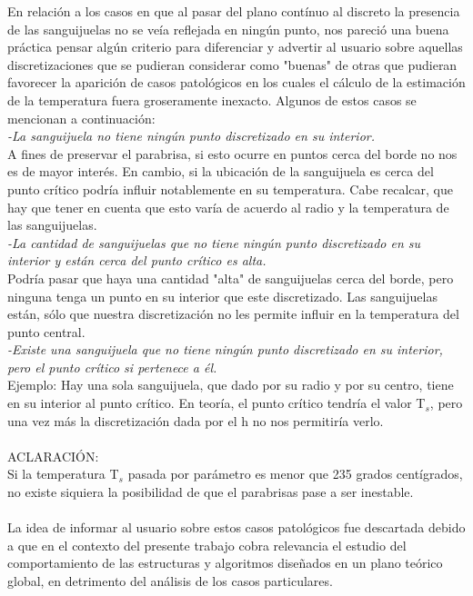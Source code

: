 \documentclass[double, 1.5in, 12pt]{beavtex}
\begin{document}
En relaci\'on a los casos en que al pasar del plano cont\'inuo al discreto la presencia de las sanguijuelas no se ve\'ia reflejada en ning\'un punto, nos pareci\'o una buena pr\'actica pensar alg\'un criterio para diferenciar y advertir al usuario sobre aquellas discretizaciones que se pudieran considerar como "buenas" de otras que pudieran favorecer la aparici\'on de casos patol\'ogicos en los cuales el c\'alculo de la estimaci\'on de la temperatura fuera groseramente inexacto. Algunos de estos casos se mencionan a continuaci\'on: \\
\emptyline
\textit{-La sanguijuela no tiene ning\'un punto discretizado en su interior.} \\
A fines de preservar el parabrisa, si esto ocurre en puntos cerca del borde no nos es de mayor inter\'es. En cambio, si la ubicaci\'on de la sanguijuela es cerca del punto cr\'itico podr\'ia influir notablemente en su temperatura. Cabe recalcar, que hay que tener en cuenta que esto var\'ia de acuerdo al radio y la temperatura de las sanguijuelas. \\
\emptyline
\textit{-La cantidad de sanguijuelas que no tiene ning\'un punto discretizado en su interior y est\'an cerca del punto cr\'itico es alta.} \\
Podr\'ia pasar que haya una cantidad "alta" de sanguijuelas cerca del borde, pero ninguna tenga un punto en su interior que este discretizado. Las sanguijuelas est\'an, s\'olo que nuestra discretizaci\'on no les permite influir en la temperatura del punto central.\\
\emptyline
\textit{-Existe una sanguijuela que no tiene ning\'un punto discretizado en su interior, pero el punto cr\'itico si pertenece a \'el.} \\
Ejemplo: Hay una sola sanguijuela, que dado por su radio y por su centro, tiene en su interior al punto cr\'itico. En teor\'ia, el punto cr\'itico tendr\'ia el valor T$_s$, pero una vez m\'as la discretizaci\'on dada por el h no nos permitir\'ia verlo. \\
\\
ACLARACI\'ON:\\
Si la temperatura T$_s$ pasada por par\'ametro es menor que 235 grados cent\'igrados, no existe siquiera la posibilidad de que el parabrisas pase a ser inestable.\\
\\

La idea de informar al usuario sobre estos casos patol\'ogicos fue descartada debido a que en el contexto del presente trabajo cobra relevancia el estudio del comportamiento de las estructuras y algoritmos diseñados en un plano te\'orico global, en detrimento del an\'alisis de los casos particulares.
\end{document}
